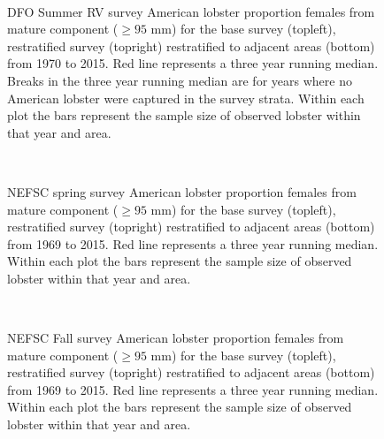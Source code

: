 \documentclass[11pt]{article}
\newcommand{\e}{/backup/bio_data/bio.lobster/figures/} %
\begin{document}

\begin{figure}
\centering
{}
\\
\caption{DFO Summer RV survey American lobster proportion females from mature component ($ \ge 95$ mm) for the base survey (topleft), restratified survey (topright) restratified to adjacent areas (bottom) from 1970 to 2015. Red line represents a three year running median. Breaks in the three year running median are for years where no American lobster were captured in the survey strata. Within each plot the bars represent the sample size of observed lobster within that year and area.}
\end{figure}
\clearpage


\begin{figure}
\centering
{}
\\
\caption{NEFSC spring survey American lobster proportion females from mature component ($ \ge 95$ mm) for the base survey (topleft), restratified survey (topright) restratified to adjacent areas (bottom) from 1969 to 2015. Red line represents a three year running median. Within each plot the bars represent the sample size of observed lobster within that year and area. }
\end{figure}
\clearpage



\begin{figure}
\centering
{}
\\
\caption{NEFSC Fall survey American lobster proportion females from mature component ($ \ge 95$ mm) for the base survey (topleft), restratified survey (topright) restratified to adjacent areas (bottom) from 1969 to 2015. Red line represents a three year running median. Within each plot the bars represent the sample size of observed lobster within that year and area. }
\end{figure}
\clearpage
\end{document}

